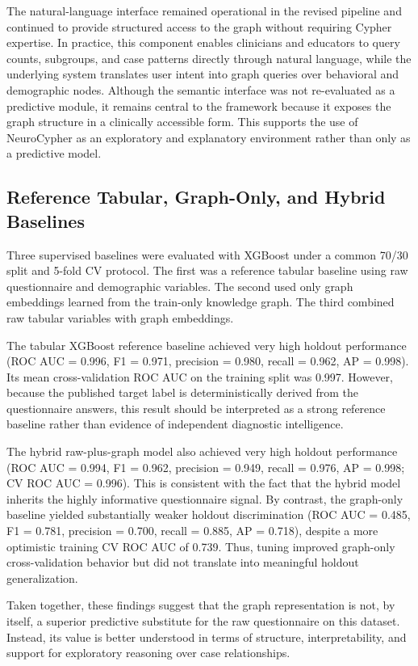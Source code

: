 \documentclass[pdflatex,sn-basic]{sn-jnl}%
\theoremstyle{thmstyleone}%
\theoremstyle{thmstyletwo}%
\theoremstyle{thmstylethree}%
\begin{document}
The natural-language interface remained operational in the revised pipeline and continued to provide structured access to the graph without requiring Cypher expertise. In practice, this component enables clinicians and educators to query counts, subgroups, and case patterns directly through natural language, while the underlying system translates user intent into graph queries over behavioral and demographic nodes. Although the semantic interface was not re-evaluated as a predictive module, it remains central to the framework because it exposes the graph structure in a clinically accessible form. This supports the use of NeuroCypher as an exploratory and explanatory environment rather than only as a predictive model.

\subsection{Reference Tabular, Graph-Only, and Hybrid Baselines}

Three supervised baselines were evaluated with XGBoost under a common 70/30 split and 5-fold CV protocol. The first was a reference tabular baseline using raw questionnaire and demographic variables. The second used only graph embeddings learned from the train-only knowledge graph. The third combined raw tabular variables with graph embeddings.

The tabular XGBoost reference baseline achieved very high holdout performance (ROC AUC = 0.996, F1 = 0.971, precision = 0.980, recall = 0.962, AP = 0.998). Its mean cross-validation ROC AUC on the training split was 0.997. However, because the published target label is deterministically derived from the questionnaire answers, this result should be interpreted as a strong reference baseline rather than evidence of independent diagnostic intelligence.

The hybrid raw-plus-graph model also achieved very high holdout performance (ROC AUC = 0.994, F1 = 0.962, precision = 0.949, recall = 0.976, AP = 0.998; CV ROC AUC = 0.996). This is consistent with the fact that the hybrid model inherits the highly informative questionnaire signal. By contrast, the graph-only baseline yielded substantially weaker holdout discrimination (ROC AUC = 0.485, F1 = 0.781, precision = 0.700, recall = 0.885, AP = 0.718), despite a more optimistic training CV ROC AUC of 0.739. Thus, tuning improved graph-only cross-validation behavior but did not translate into meaningful holdout generalization.

Taken together, these findings suggest that the graph representation is not, by itself, a superior predictive substitute for the raw questionnaire on this dataset. Instead, its value is better understood in terms of structure, interpretability, and support for exploratory reasoning over case relationships.
\end{document}
